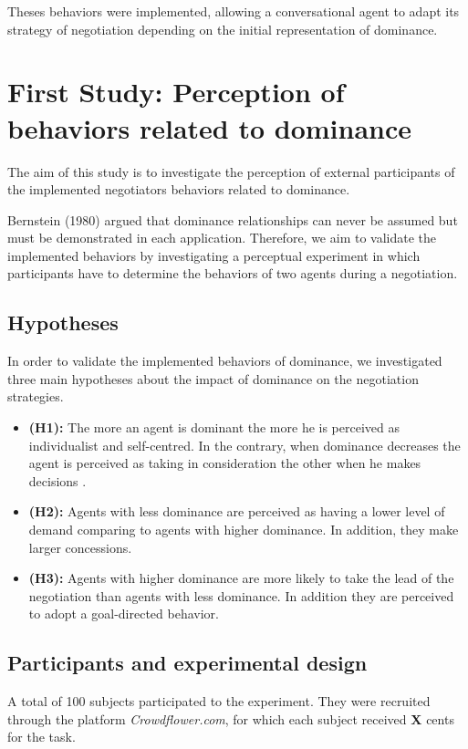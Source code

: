 \documentclass{article}
\begin{document}
			\par Theses behaviors were implemented, allowing a conversational agent to adapt its strategy of negotiation depending on the initial representation of dominance. 
			
		\section{First Study: Perception of behaviors related to dominance}
			 			
			 The aim of this study is to investigate the perception of external participants of the implemented negotiators behaviors related to dominance. 

			Bernstein (1980) argued that dominance relationships can never be assumed but must be demonstrated in each application. Therefore, we aim to validate the implemented behaviors by investigating a perceptual experiment in which participants have to determine the behaviors of two agents during a negotiation. 
			
			\subsection{Hypotheses}
			
			In order to validate the implemented behaviors of dominance, we investigated three main hypotheses about the impact of dominance on the negotiation strategies. 
			\begin{itemize}
				\item  \textbf{(H1):} The more an agent is dominant the more he is perceived as individualist and self-centred. In the contrary, when dominance decreases the agent is perceived as taking in consideration the other when he makes decisions . 
				
				\item \textbf{(H2):} Agents with less dominance  are perceived as having a lower level of demand comparing to agents with higher dominance. In addition, they make larger concessions.
				
				\item \textbf{(H3):} Agents with higher dominance are more likely to take the lead of the negotiation than agents with less dominance. In addition they are perceived to adopt a goal-directed behavior. 

			\end{itemize}
		
			\subsection{Participants and experimental design}
				A total of 100 subjects participated to the experiment. They were recruited through the platform \emph{Crowdflower.com}, for which each subject received \textbf{X} cents for the task.
				
\end{document}
